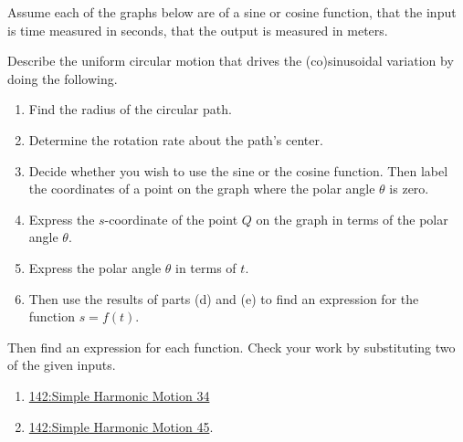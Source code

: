 \documentclass{ximera}
\begin{document}
\begin{exercise} \label{ELDKFeef}
Assume each of the graphs below are of a sine or cosine function, that the input is time measured in seconds, that the output is measured in meters.

Describe the uniform circular motion that drives the (co)sinusoidal variation by doing the following.
 
\begin{enumerate}
\item Find the radius of the circular path.

\item Determine the rotation rate about the path's center.

\item Decide whether you wish to use the sine or the cosine function. Then label the coordinates of a point on the graph where the polar angle $\theta$ is zero.

\item Express the $s$-coordinate of the point $Q$ on the graph in terms of the polar angle $\theta$.

\item Express the polar angle $\theta$ in terms of $t$.

\item Then use the results of parts (d) and (e) to find an expression for the function $s=f(t)$.



\end{enumerate}

Then find an expression for each function. Check your work by substituting two of the given inputs.


\begin{enumerate}

\item \href{https://www.desmos.com/calculator/4f6673ba8a}{142:Simple Harmonic Motion 34}



 
\begin{onlineOnly}
    \begin{center}
\end{center}
\end{onlineOnly}


\item 

\href{https://www.desmos.com/calculator/ust9xnjjaz}{142:Simple Harmonic Motion 45}.


\end{enumerate}
\end{exercise}
\end{document}
